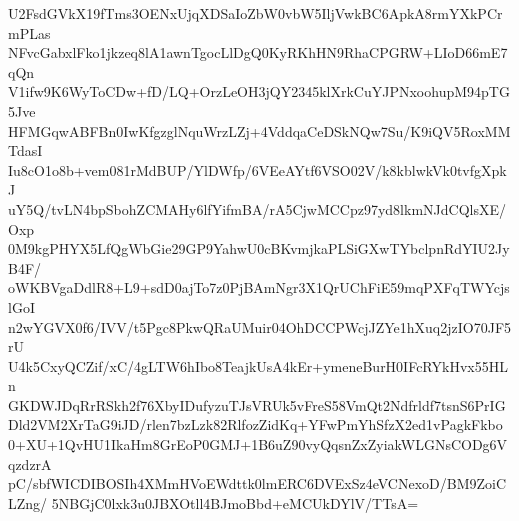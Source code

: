 U2FsdGVkX19fTms3OENxUjqXDSaIoZbW0vbW5IljVwkBC6ApkA8rmYXkPCrmPLas
NFvcGabxlFko1jkzeq8lA1awnTgocLlDgQ0KyRKhHN9RhaCPGRW+LIoD66mE7qQn
V1ifw9K6WyToCDw+fD/LQ+OrzLeOH3jQY2345klXrkCuYJPNxoohupM94pTG5Jve
HFMGqwABFBn0IwKfgzglNquWrzLZj+4VddqaCeDSkNQw7Su/K9iQV5RoxMMTdasI
Iu8cO1o8b+vem081rMdBUP/YlDWfp/6VEeAYtf6VSO02V/k8kblwkVk0tvfgXpkJ
uY5Q/tvLN4bpSbohZCMAHy6lfYifmBA/rA5CjwMCCpz97yd8lkmNJdCQlsXE/Oxp
0M9kgPHYX5LfQgWbGie29GP9YahwU0cBKvmjkaPLSiGXwTYbclpnRdYIU2JyB4F/
oWKBVgaDdlR8+L9+sdD0ajTo7z0PjBAmNgr3X1QrUChFiE59mqPXFqTWYcjslGoI
n2wYGVX0f6/IVV/t5Pgc8PkwQRaUMuir04OhDCCPWcjJZYe1hXuq2jzIO70JF5rU
U4k5CxyQCZif/xC/4gLTW6hIbo8TeajkUsA4kEr+ymeneBurH0IFcRYkHvx55HLn
GKDWJDqRrRSkh2f76XbyIDufyzuTJsVRUk5vFreS58VmQt2Ndfrldf7tsnS6PrIG
Dld2VM2XrTaG9iJD/rlen7bzLzk82RlfozZidKq+YFwPmYhSfzX2ed1vPagkFkbo
0+XU+1QvHU1IkaHm8GrEoP0GMJ+1B6uZ90vyQqsnZxZyiakWLGNsCODg6VqzdzrA
pC/sbfWICDIBOSIh4XMmHVoEWdttk0lmERC6DVExSz4eVCNexoD/BM9ZoiCLZng/
5NBGjC0lxk3u0JBXOtll4BJmoBbd+eMCUkDYlV/TTsA=
